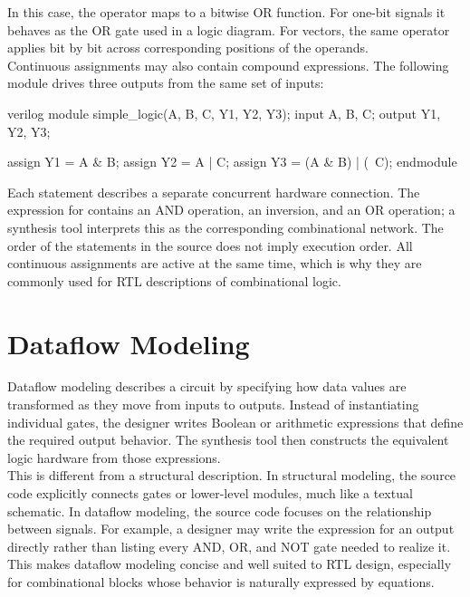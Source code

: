 \noindent In this case, the operator \inlinecode{|} maps to a bitwise OR function. For one-bit
signals it behaves as the OR gate used in a logic diagram. For vectors, the same operator applies
bit by bit across corresponding positions of the operands.\\

\noindent Continuous assignments may also contain compound expressions. The following module drives
three outputs from the same set of inputs:

\begin{codeblock}{verilog}
module simple_logic(A, B, C, Y1, Y2, Y3);
    input A, B, C;
    output Y1, Y2, Y3;

    assign Y1 = A & B;
    assign Y2 = A | C;
    assign Y3 = (A & B) | (~C);
endmodule
\end{codeblock}

\noindent Each  statement describes a separate concurrent hardware connection.
The expression for  contains an AND operation, an inversion, and an OR operation; a
synthesis tool interprets this as the corresponding combinational network. The order of the
statements in the source does not imply execution order. All continuous assignments are active at
the same time, which is why they are commonly used for RTL descriptions of combinational logic.

\section{Dataflow Modeling}
Dataflow modeling describes a circuit by specifying how data values are transformed as they move
from inputs to outputs. Instead of instantiating individual gates, the designer writes Boolean or
arithmetic expressions that define the required output behavior. The synthesis tool then constructs
the equivalent logic hardware from those expressions.\\

\noindent This is different from a structural description. In structural modeling, the source code
explicitly connects gates or lower-level modules, much like a textual schematic. In dataflow
modeling, the source code focuses on the relationship between signals. For example, a designer may
write the expression for an output directly rather than listing every AND, OR, and NOT gate needed
to realize it. This makes dataflow modeling concise and well suited to RTL design, especially for
combinational blocks whose behavior is naturally expressed by equations.\\

